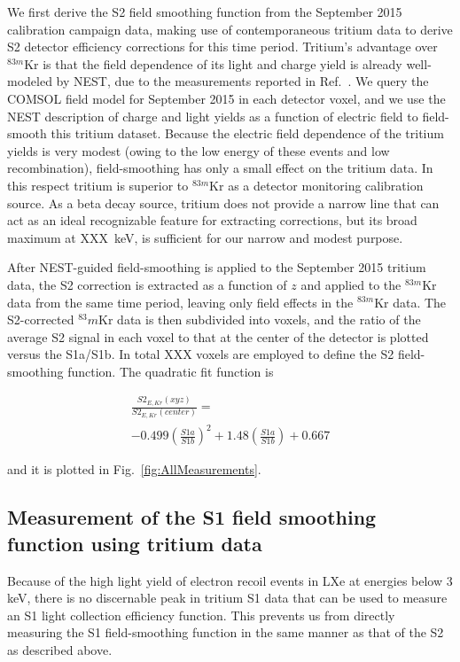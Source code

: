 We first derive the S2 field smoothing function from the September 2015 calibration campaign data,
making use of contemporaneous tritium data to derive S2 detector efficiency corrections 
for this time period. Tritium's advantage over $^{83m}$Kr is that the field dependence of its light and charge 
yield is already well-modeled by NEST, due to the measurements reported in Ref.~\cite{tritium}.
We query the COMSOL field model for September 2015 in each detector voxel, and we use the NEST description of
charge and light yields as a function of electric field to field-smooth this tritium dataset.
Because the electric field dependence of the tritium yields is very modest (owing to the low energy of these events 
and low recombination), field-smoothing has only a small
effect on the tritium data. In this respect tritium is superior to $^{83m}$Kr as a detector monitoring calibration source. 
As a beta decay source, tritium does not provide a narrow line that can act as an ideal recognizable 
feature for extracting corrections, but its broad maximum at XXX~keV, 
is sufficient for our narrow and modest purpose. 

After NEST-guided field-smoothing is applied to the September 2015 tritium data, the S2 correction
is extracted as a function of $z$ and applied to the $^{83m}$Kr data from the same time period, leaving
only field effects in the $^{83m}$Kr data. The 
S2-corrected $^83m$Kr data is then subdivided into voxels, and the ratio of the average 
S2 signal in each voxel to that at the center of the detector is plotted versus the S1a/S1b. In total XXX
voxels are employed to define the S2 field-smoothing function. The quadratic fit function is 

 \begin{multline}
\frac{S2_{E,Kr}(xyz)}{S2_{E,Kr}(center)} =   \\ -0.499 \left(\frac{S1a}{S1b} \right)^2 + 1.48  \left(\frac{S1a}{S1b} \right) + 0.667
\end{multline}

\noindent
and it is plotted in Fig.~\ref{fig:AllMeasurements}.

\subsection{Measurement of the S1 field smoothing function using tritium data}



Because of the high light yield of electron recoil events in LXe at energies below 3 keV, there is no discernable peak in tritium S1 
data that can be used to measure an S1 light collection efficiency function. 
This prevents us from directly measuring the S1 field-smoothing function in the same manner as that of 
the S2 as described above. 

